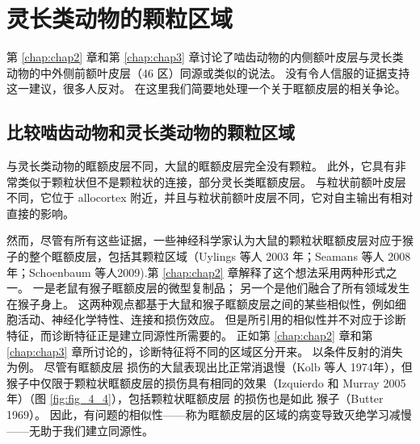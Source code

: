 \section{灵长类动物的颗粒区域}

第 \ref{chap:chap2} 章和第 \ref{chap:chap3} 章讨论了啮齿动物的内侧额叶皮层与灵长类动物的中外侧前额叶皮层（46 区）同源或类似的说法。
没有令人信服的证据支持这一建议，很多人反对。 在这里我们简要地处理一个关于眶额皮层的相关争论。\par



\subsection{比较啮齿动物和灵长类动物的颗粒区域}

与灵长类动物的眶额皮层不同，大鼠的眶额皮层完全没有颗粒。
此外，它具有非常类似于颗粒状但不是颗粒状的连接，部分灵长类眶额皮层。
与粒状前额叶皮层不同，它位于 allocortex 附近，并且与粒状前额叶皮层不同，它对自主输出有相对直接的影响。\par


然而，尽管有所有这些证据，一些神经科学家认为大鼠的颗粒状眶额皮层对应于猴子的整个眶额皮层，包括其颗粒区域（Uylings 等人 2003 年；Seamans 等人 2008 年；Schoenbaum 等人2009).第 \ref{chap:chap2} 章解释了这个想法采用两种形式之一。
一是老鼠有猴子眶额皮层的微型复制品；
另一个是他们融合了所有领域发生在猴子身上。
这两种观点都基于大鼠和猴子眶额皮层之间的某些相似性，例如细胞活动、神经化学特性、连接和损伤效应。
但是所引用的相似性并不对应于诊断特征，而诊断特征正是建立同源性所需要的。
正如第 \ref{chap:chap2} 章和第 \ref{chap:chap3} 章所讨论的，诊断特征将不同的区域区分开来。
以条件反射的消失为例。
尽管有眶额皮层 损伤的大鼠表现出比正常消退慢（Kolb 等人 1974年），但猴子中仅限于颗粒状眶额皮层的损伤具有相同的效果（Izquierdo 和 Murray 2005 年）（图 \ref{fig:fig_4_4}），包括颗粒状眶额皮层 的损伤也是如此 猴子（Butter 1969）。
因此，有问题的相似性——称为眶额皮层的区域的病变导致灭绝学习减慢——无助于我们建立同源性。\par


